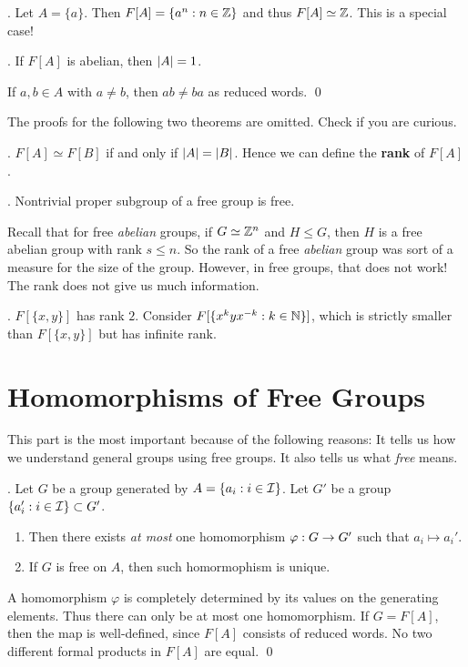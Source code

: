 \ex. Let \(A = \{a\}\). Then \(F[A] = \{a^n : n \in \mathbb{Z}\}\) and thus \(F[A] \simeq \mathbb{Z}\). This is a special case!

\prop. If \(F[A]\) is abelian, then \(\left| A \right| = 1\).

\pf If \(a, b \in A\) with \(a \neq b\), then \(ab \neq ba\) as reduced words. \qed

The proofs for the following two theorems are omitted. Check if you are curious.

\thm. \(F[A] \simeq F[B]\) if and only if \(\left| A \right| = \left| B \right|\). Hence we can define the \textbf{rank} of \(F[A]\).

\thm. Nontrivial proper subgroup of a free group is free.

Recall that for free \textit{abelian} groups, if \(G \simeq \mathbb{Z}^n\) and \(H \leq G\), then \(H\) is a free abelian group with rank \(s \leq n\). So the rank of a free \textit{abelian} group was sort of a measure for the size of the group. However, in free groups, that does not work! The rank does not give us much information.

\ex. \(F[\{x, y\}]\) has rank \(2\). Consider \(F[\{x^k y x^{-k} : k \in \mathbb{N} \}]\), which is strictly smaller than \(F[\{x, y\}]\) but has infinite rank.

\section*{Homomorphisms of Free Groups}

This part is the most important because of the following reasons: It tells us how we understand general groups using free groups. It also tells us what \textit{free} means.

\thm. Let \(G\) be a group generated by \(A = \{a_i : i \in \mathcal{I}\}\). Let \(G'\) be a group \(\{a_i' : i \in \mathcal{I}\} \subset G'\).
\begin{enumerate}
    \item Then there exists \textit{at most} one homomorphism \(\varphi : G \rightarrow G'\) such that \(a_i \mapsto a_i'\).
    \item If \(G\) is free on \(A\), then such homormophism is unique.
\end{enumerate}

\pf A homomorphism \(\varphi\) is completely determined by its values on the generating elements. Thus there can only be at most one homomorphism. If \(G = F[A]\), then the map is well-defined, since \(F[A]\) consists of reduced words. No two different formal products in \(F[A]\) are equal. \qed

